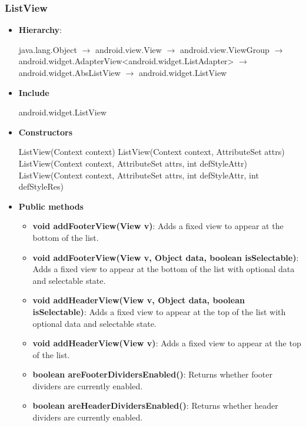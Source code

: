 \documentclass{report}
\begin{document}
    \subsubsection{ListView}
    \begin{itemize}
        \item \textbf{Hierarchy}:       
            \begin{center}
                java.lang.Object $\to$	android.view.View $\to$	android.view.ViewGroup $\to$	android.widget.AdapterView<android.widget.ListAdapter> $\to$	android.widget.AbsListView $\to$	android.widget.ListView
            \end{center}
        \item \textbf{Include}
            \bigbreak \noindent 
            \begin{javacode}
                android.widget.ListView
            \end{javacode}
        \item \textbf{Constructors}
            \bigbreak \noindent 
            \begin{javacode}
                ListView(Context context)
                ListView(Context context, AttributeSet attrs)
                ListView(Context context, AttributeSet attrs, int defStyleAttr)
                ListView(Context context, AttributeSet attrs, int defStyleAttr, int defStyleRes)
            \end{javacode}
        \item \textbf{Public methods}
            \begin{itemize}
                \item \textbf{void addFooterView(View v)}: Adds a fixed view to appear at the bottom of the list.
                \item \textbf{void addFooterView(View v, Object data, boolean isSelectable)}: Adds a fixed view to appear at the bottom of the list with optional data and selectable state.
                \item \textbf{void addHeaderView(View v, Object data, boolean isSelectable)}: Adds a fixed view to appear at the top of the list with optional data and selectable state.
                \item \textbf{void addHeaderView(View v)}: Adds a fixed view to appear at the top of the list.
                \item \textbf{boolean areFooterDividersEnabled()}: Returns whether footer dividers are currently enabled.
                \item \textbf{boolean areHeaderDividersEnabled()}: Returns whether header dividers are currently enabled.

\end{itemize}
\end{itemize}
\end{document}

